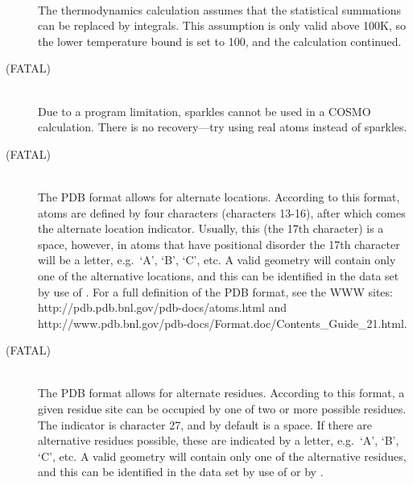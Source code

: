 \begin{description}
\item[]~\\
The  thermodynamics  calculation  assumes  that   the   statistical summations 
can be replaced by integrals.  This assumption is only valid above 100K, so the
lower temperature  bound  is  set  to  100,  and  the calculation continued.

\item[ (FATAL)]~\\
Due to a program limitation, sparkles cannot be used in a COSMO calculation.
There is no recovery---try using real atoms instead of sparkles.

\item[ (FATAL)]~\\
The PDB format allows for alternate locations.  According to this format,
atoms  are defined by four characters (characters 13-16), after which comes 
the alternate location indicator. Usually,  this (the 17th character) is a
space, however, in atoms that have  positional disorder the 17th character will
be a letter, e.g.\ `A', `B', `C', etc. A valid geometry will contain only one of
the alternative locations, and this can be identified in the data set by use of
.  For a  full definition of the PDB format, see the WWW
sites: http://pdb.pdb.bnl.gov/pdb-docs/atoms.html  and
http://www.pdb.bnl.gov/pdb-docs/Format.doc/Contents\_Guide\_21.html.

\item[ (FATAL)]~\\
The PDB format allows for alternate residues.  According to this format, a 
given residue site can be occupied by one of two or more possible residues. 
The indicator is character 27, and by default is a space.  If there are
alternative residues possible, these are indicated by a letter, e.g.\ `A', `B',
`C', etc. A valid geometry will contain only one of the alternative residues,
and this can be identified in the data set by use of  or
by .
                    

\end{description}
